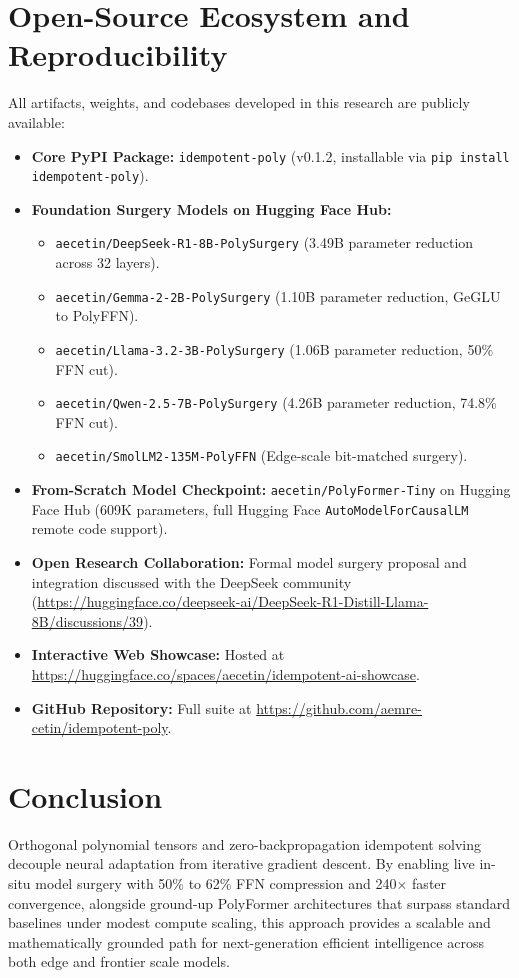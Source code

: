 \documentclass[journal,lettersize]{IEEEtran}
\begin{document}
\section{Open-Source Ecosystem and Reproducibility}
All artifacts, weights, and codebases developed in this research are publicly available:
\begin{itemize}
    \setlength{\itemsep}{1pt}
    \setlength{\parskip}{0pt}
    \item \textbf{Core PyPI Package:} \texttt{idempotent-poly} (v0.1.2, installable via \texttt{pip install idempotent-poly}).
    \item \textbf{Foundation Surgery Models on Hugging Face Hub:}
    \begin{itemize}
        \setlength{\itemsep}{0.5pt}
        \setlength{\parskip}{0pt}
        \item \texttt{aecetin/DeepSeek-R1-8B-PolySurgery} (3.49B parameter reduction across 32 layers).
        \item \texttt{aecetin/Gemma-2-2B-PolySurgery} (1.10B parameter reduction, GeGLU to PolyFFN).
        \item \texttt{aecetin/Llama-3.2-3B-PolySurgery} (1.06B parameter reduction, 50\% FFN cut).
        \item \texttt{aecetin/Qwen-2.5-7B-PolySurgery} (4.26B parameter reduction, 74.8\% FFN cut).
        \item \texttt{aecetin/SmolLM2-135M-PolyFFN} (Edge-scale bit-matched surgery).
    \end{itemize}
    \item \textbf{From-Scratch Model Checkpoint:} \texttt{aecetin/PolyFormer-Tiny} on Hugging Face Hub (609K parameters, full Hugging Face \texttt{AutoModelForCausalLM} remote code support).
    \item \textbf{Open Research Collaboration:} Formal model surgery proposal and integration discussed with the DeepSeek community (\url{https://huggingface.co/deepseek-ai/DeepSeek-R1-Distill-Llama-8B/discussions/39}).
    \item \textbf{Interactive Web Showcase:} Hosted at \url{https://huggingface.co/spaces/aecetin/idempotent-ai-showcase}.
    \item \textbf{GitHub Repository:} Full suite at \url{https://github.com/aemre-cetin/idempotent-poly}.
\end{itemize}

\section{Conclusion}
Orthogonal polynomial tensors and zero-backpropagation idempotent solving decouple neural adaptation from iterative gradient descent. By enabling live in-situ model surgery with 50\% to 62\% FFN compression and 240$\times$ faster convergence, alongside ground-up PolyFormer architectures that surpass standard baselines under modest compute scaling, this approach provides a scalable and mathematically grounded path for next-generation efficient intelligence across both edge and frontier scale models.
\end{document}
